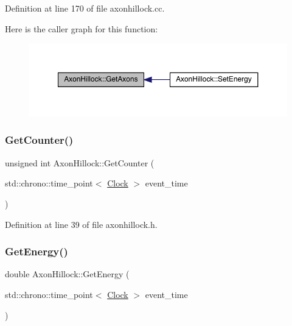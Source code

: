 Definition at line 170 of file axonhillock.\+cc.

Here is the caller graph for this function\+:
\nopagebreak
\begin{figure}[H]
\begin{center}
\leavevmode
\includegraphics[width=350pt]{class_axon_hillock_af35663768cbe818e092382519a6d73e3_icgraph}
\end{center}
\end{figure}
\mbox{\label{class_axon_hillock_a429c9876d679fe8de4533725afc4875c}} 
\subsubsection{\texorpdfstring{Get\+Counter()}{GetCounter()}}
{\footnotesize\ttfamily unsigned int Axon\+Hillock\+::\+Get\+Counter (\begin{DoxyParamCaption}\item[{std\+::chrono\+::time\+\_\+point$<$ \hyperlink{universe_8h_a0ef8d951d1ca5ab3cfaf7ab4c7a6fd80}{Clock} $>$}]{event\+\_\+time }\end{DoxyParamCaption})\hspace{0.3cm}{\ttfamily [inline]}}



Definition at line 39 of file axonhillock.\+h.

\mbox{\label{class_axon_hillock_ab5ac3ab8771b96acf7e3fa07152525a5}} 
\subsubsection{\texorpdfstring{Get\+Energy()}{GetEnergy()}}
{\footnotesize\ttfamily double Axon\+Hillock\+::\+Get\+Energy (\begin{DoxyParamCaption}\item[{std\+::chrono\+::time\+\_\+point$<$ \hyperlink{universe_8h_a0ef8d951d1ca5ab3cfaf7ab4c7a6fd80}{Clock} $>$}]{event\+\_\+time }\end{DoxyParamCaption})\hspace{0.3cm}{\ttfamily [inline]}}



